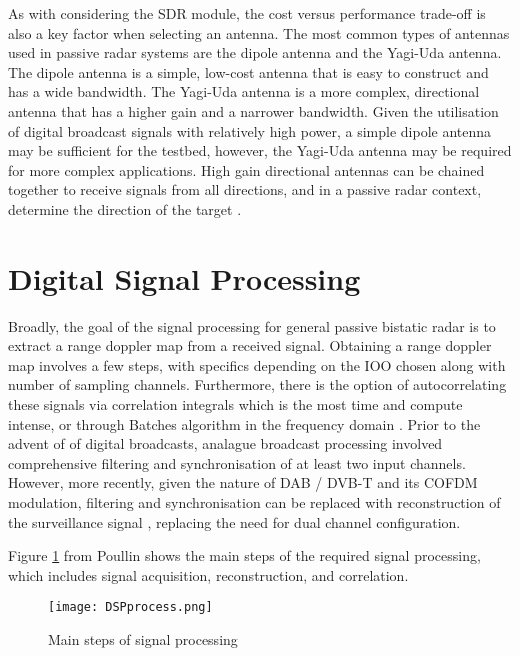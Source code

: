 As with considering the SDR module, the cost versus performance trade-off is also a key factor when selecting an antenna. The most common types of antennas used in passive radar systems are the dipole antenna and the Yagi-Uda antenna. The dipole antenna is a simple, low-cost antenna that is easy to construct and has a wide bandwidth. The Yagi-Uda antenna is a more complex, directional antenna that has a higher gain and a narrower bandwidth. Given the utilisation of digital broadcast signals with relatively high power, a simple dipole antenna may be sufficient for the testbed, however, the Yagi-Uda antenna may be required for more complex applications. High gain directional antennas can be chained together to receive signals from all directions, and in a passive radar context, determine the direction of the target \cite{KrakenSDR}.


\section{Digital Signal Processing}
Broadly, the goal of the signal processing for general passive bistatic radar is to extract a range doppler map from a received signal. Obtaining a range doppler map involves a few steps, with specifics depending on the IOO chosen along with number of sampling channels. Furthermore, there is the option of autocorrelating these signals via correlation integrals which is the most time and compute intense, or through Batches algorithm in the frequency domain . Prior to the advent of of digital broadcasts, analague broadcast processing involved comprehensive filtering and synchronisation of at least two input channels\cite{DSPfm}. However, more recently, given the nature of DAB / DVB-T and its COFDM modulation, filtering and synchronisation can be replaced with reconstruction of the surveillance signal \cite{DSPdab}, replacing the need for dual channel configuration. 

\par \vspace{0.5cm}
\noindent Figure \ref{fig:DSP} from Poullin \cite{detectionDABmodulation} shows the main steps of the required signal processing, which includes signal acquisition, reconstruction, and correlation. 


\begin{figure}[htbp]
    \centering
    \texttt{[image: DSPprocess.png]}
    \caption{Main steps of signal processing \cite{detectionDABmodulation}}
    \label{fig:DSP}
\end{figure}


